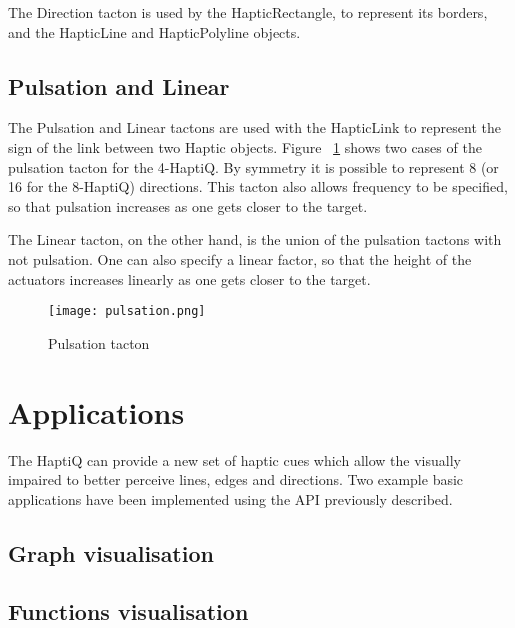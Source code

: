 The Direction tacton is used by the HapticRectangle, to represent its borders, and the HapticLine and HapticPolyline objects. 

\subsection{Pulsation and Linear}
The Pulsation and Linear tactons are used with the HapticLink to represent the sign of the link between two Haptic objects. Figure ~\ref{fig:pulsation} shows two cases of the pulsation tacton for the 4-HaptiQ. By symmetry it is possible to represent 8 (or 16 for the 8-HaptiQ) directions. This tacton also allows frequency to be specified, so that pulsation increases as one gets closer to the target. 

The Linear tacton, on the other hand, is the union of the pulsation tactons with not pulsation. One can also specify a linear factor, so that the height of the actuators increases linearly as one gets closer to the target. 

\begin{figure}[H]
  \centering
  \texttt{[image: pulsation.png]}
  \caption{Pulsation tacton}
  \label{fig:pulsation}
\end{figure}

\section{Applications}

The HaptiQ can provide a new set of haptic cues which allow the visually impaired to better perceive lines, edges and directions. Two example basic applications have been implemented using the API previously described.

\subsection{Graph visualisation}

\subsection{Functions visualisation}

